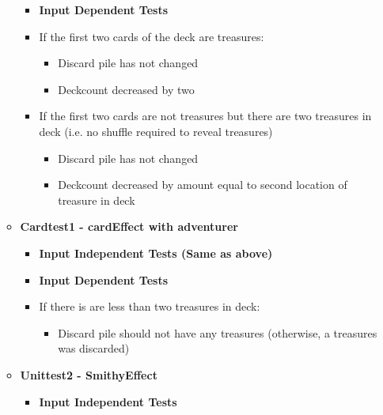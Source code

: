 \documentclass[11pt,letterpaper]{article}
\begin{document}
\begin{enumerate}[label=\Roman*.]
\begin{itemize}[leftmargin=*]
\begin{itemize}[leftmargin=*, label={}]
          \item \textbf{Input Dependent Tests}
          \item If the first two cards of the deck are treasures: 
            \begin{itemize}[leftmargin=*]
              \item Discard pile has not changed
              \item Deckcount decreased by two
            \end{itemize}
          \item If the first two cards are not treasures but there are two treasures in deck (i.e. no shuffle required to reveal treasures)
            \begin{itemize}[leftmargin=*]
              \item Discard pile has not changed
              \item Deckcount decreased by amount equal to second location of treasure in deck
            \end{itemize}
        \end{itemize}

      \item \textbf{Cardtest1 - cardEffect with adventurer}
        \begin{itemize}[leftmargin=*, label={}]
          \item \textbf{Input Independent Tests (Same as above)}
          \item \textbf{Input Dependent Tests}
          \item If there is are less than two treasures in deck:
            \begin{itemize}[leftmargin=*]
              \item Discard pile should not have any treasures (otherwise, a treasures was discarded)
            \end{itemize}
        \end{itemize}

      \item \textbf{Unittest2 - SmithyEffect}

        \begin{itemize}[leftmargin=*, label={}]
          \item \textbf{Input Independent Tests}


\end{itemize}
\end{itemize}
\end{enumerate}
\end{document}
